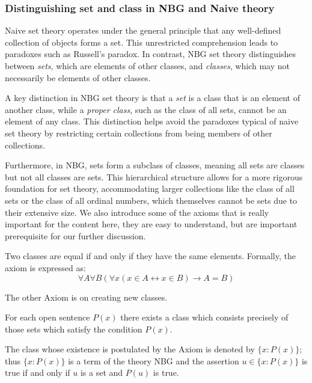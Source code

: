 \subsubsection*{Distinguishing set and class in NBG and Naive theory}
Naive set theory operates under the general principle that any well-defined collection of objects forms a set. This unrestricted comprehension leads to paradoxes such as Russell's paradox. In contrast, NBG set theory distinguishes between \emph{sets}, which are elements of other classes, and \emph{classes}, which may not necessarily be elements of other classes. 

A key distinction in NBG set theory is that a \emph{set} is a class that is an element of another class, while a \emph{proper class}, such as the class of all sets, cannot be an element of any class. This distinction helps avoid the paradoxes typical of naive set theory by restricting certain collections from being members of other collections.

Furthermore, in NBG, sets form a subclass of classes, meaning all sets are classes but not all classes are sets. This hierarchical structure allows for a more rigorous foundation for set theory, accommodating larger collections like the class of all sets or the class of all ordinal numbers, which themselves cannot be sets due to their extensive size.
We also introduce some of the axioms that is really important for the content here, they are
easy to understand, but are important prerequisite for our further discussion.
\begin{axiom}
    Two classes are equal if and only if they have the same elements.
    Formally, the axiom is expressed as:
    \[
    \forall A \forall B (\forall x (x \in A \leftrightarrow x \in B) \rightarrow A = B)
    \]
    
\end{axiom}

The other Axiom is on creating new classes.
\begin{axiom}
    For each open sentence \( P(x) \) there exists a class which consists precisely of those sets which satisfy the condition \( P(x) \).
    
    The class whose existence is postulated by the Axiom is denoted by \( \{x : P(x)\} \); thus 
    \( \{x : P(x)\} \) is a term of the theory NBG and the assertion \( u \in \{x : P(x)\} \) is true if 
    and only if \( u \) is a set and \( P(u) \) is true.
\end{axiom}
